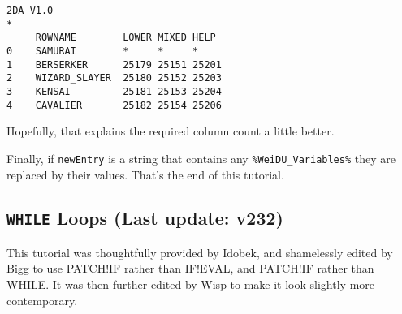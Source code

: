 \documentclass{article}
\def\ttref#1{\ahrefloc{#1}{\tt #1}}
\def\DEFINE#1{{\tt \bf #1}\label{#1}\index{#1}}
\def\t#1{{\tt #1}}
\begin{document}
\begin{verbatim}
2DA V1.0
*
     ROWNAME        LOWER MIXED HELP
0    SAMURAI        *     *     *
1    BERSERKER      25179 25151 25201
2    WIZARD_SLAYER  25180 25152 25203
3    KENSAI         25181 25153 25204
4    CAVALIER       25182 25154 25206
\end{verbatim}

Hopefully, that explains the required column count a little better.

%
%
%
%

Finally, if \t{newEntry} is a string that contains any
\t{\%WeiDU\_Variables\%} they are replaced by their values.
That's the end of this tutorial.

\subsection{\DEFINE{WHILE} Loops (Last update: v232)}

This tutorial was thoughtfully provided by Idobek, and shamelessly edited
by Bigg to use PATCH!IF rather than IF!EVAL, and PATCH!IF rather than WHILE.
It was then further edited by Wisp to make it look slightly more contemporary.
\end{document}
